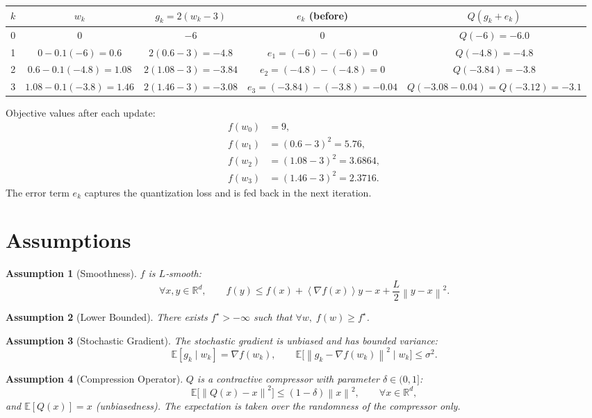 \documentclass[11pt]{article}
\newtheorem{assumption}{Assumption}
\newcommand{\E}{\mathbb{E}}
\newcommand{\R}{\mathbb{R}}
\newcommand{\norm}[1]{\left\|#1\right\|}
\newcommand{\inner}[1]{\left\langle #1 \right\rangle}
\begin{document}
\begin{center}
\begin{tabular}{c|c|c|c|c}
\toprule
$k$ & $w_{k}$ & $g_{k}=2(w_{k}-3)$ & $e_{k}$ (before) & $Q(g_{k}+e_{k})$\\
\midrule
0 & $0$ & $-6$ & $0$ & $Q(-6)=-6.0$\\
1 & $0-0.1(-6) = 0.6$ & $2(0.6-3)=-4.8$ & $e_{1}=(-6)-(-6)=0$ & $Q(-4.8)=-4.8$\\
2 & $0.6-0.1(-4.8)=1.08$ & $2(1.08-3)=-3.84$ & $e_{2}=(-4.8)-(-4.8)=0$ & $Q(-3.84)=-3.8$\\
3 & $1.08-0.1(-3.8)=1.46$ & $2(1.46-3)=-3.08$ & $e_{3}=(-3.84)-(-3.8)=-0.04$ & $Q(-3.08-0.04) = Q(-3.12)=-3.1$\\
\bottomrule
\end{tabular}
\end{center}
Objective values after each update:
\[
\begin{aligned}
f(w_{0}) &= 9,\\
f(w_{1}) &= (0.6-3)^{2}=5.76,\\
f(w_{2}) &= (1.08-3)^{2}=3.6864,\\
f(w_{3}) &= (1.46-3)^{2}=2.3716.
\end{aligned}
\]
The error term $e_{k}$ captures the quantization loss and is fed back in the next iteration.

\newpage
\section*{Assumptions}
\begin{assumption}[Smoothness]\label{as:lip}
$f$ is $L$‑smooth:
\[
\forall x,y\in\R^{d},\qquad 
f(y)\le f(x)+\inner{\nabla f(x)}{y-x}+\frac{L}{2}\norm{y-x}^{2}.
\]
\end{assumption}
\begin{assumption}[Lower Bounded]\label{as:lb}
There exists $f^{\star}>-\infty$ such that $\forall w,\; f(w)\ge f^{\star}$.
\end{assumption}
\begin{assumption}[Stochastic Gradient]\label{as:sg}
The stochastic gradient is unbiased and has bounded variance:
\[
\E[g_{k}\mid w_{k}]=\nabla f(w_{k}),\qquad
\E\!\big[\norm{g_{k}-\nabla f(w_{k})}^{2}\mid w_{k}\big]\le\sigma^{2}.
\]
\end{assumption}
\begin{assumption}[Compression Operator]\label{as:comp}
$Q$ is a \emph{contractive compressor} with parameter $\delta\in(0,1]$:
\[
\E\!\big[\norm{Q(x)-x}^{2}\big]\le (1-\delta)\norm{x}^{2},
\qquad\forall x\in\R^{d},
\]
and $\E[Q(x)]=x$ (unbiasedness).  
The expectation is taken over the randomness of the compressor only.
\end{assumption}
\end{document}

